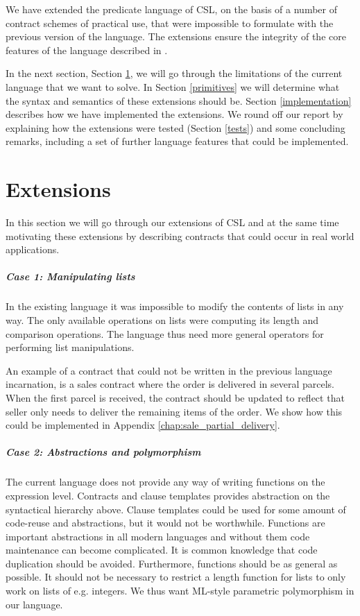 \documentclass[10pt,a4paper,final,oneside,openany,article]{memoir}
\begin{document}
We have extended the predicate language of CSL, on the basis of a
number of contract schemes of practical use, that were impossible to
formulate with the previous version of the language. The extensions
ensure the integrity of the core features of the language described in
\cite{hvitved10}. 

In the next section, Section \ref{extensions}, we will go through the
limitations of the current language that we want to solve. In Section
\ref{primitives} we will determine what the syntax and semantics of
these extensions should be. Section \ref{implementation} describes how
we have implemented the extensions. We round off our report by
explaining how the extensions were tested (Section \ref{tests}) and
some concluding remarks, including a set of further language features
that could be implemented.

\chapter{Extensions}
\label{extensions} In this section we will go through our extensions
of CSL and at the same time motivating these extensions by describing
contracts that could occur in real world applications.

\paragraph{Case 1: Manipulating lists} In the existing language it was
impossible to modify the contents of lists in any way. The only
available operations on lists were computing its length and comparison
operations. The language thus need more general operators for
performing list manipulations.

An example of a contract that could not be written in the previous
language incarnation, is a sales contract where the order is delivered
in several parcels. When the first parcel is received, the contract
should be updated to reflect that seller only needs to deliver the
remaining items of the order.  We show how this could be implemented
in Appendix \ref{chap:sale_partial_delivery}.

\paragraph{Case 2: Abstractions and polymorphism} The current language
does not provide any way of writing functions on the expression
level. Contracts and clause templates provides abstraction on the
syntactical hierarchy above. Clause templates could be used for
some amount of code-reuse and abstractions, but it would not be
worthwhile. Functions are important abstractions in all modern
languages and without them code maintenance can become complicated. It
is common knowledge that code duplication should be avoided.
Furthermore, functions should be as general as possible. It should not
be necessary to restrict a length function for lists to only work on
lists of e.g. integers. We thus want ML-style parametric polymorphism
in our language.
\end{document}
